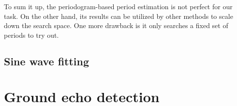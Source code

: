 To sum it up, the periodogram-based period estimation is not perfect for our task. On the other hand, its results can be utilized by other methods to scale down the search space. One more drawback is it only searches a fixed set of periods to try out.

\subsection{Sine wave fitting}
 
\section{Ground echo detection}















